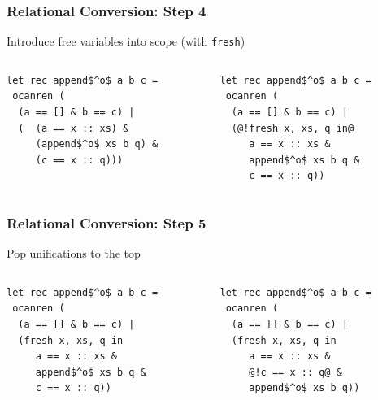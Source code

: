\documentclass[xcolor=table]{beamer}
\begin{document}
\begin{frame}[fragile]
  \transwipe[direction=90]
  \frametitle{Relational Conversion: Step 4}
\begin{center}
Introduce free variables into scope  (with \lstinline{fresh})
\end{center}

\begin{columns}
\begin{column}{0.5\textwidth}
\begin{lstlisting}
let rec append$^o$ a b c =
 ocanren (
  (a == [] & b == c) |
  (  (a == x :: xs) &
     (append$^o$ xs b q) &
     (c == x :: q)))
\end{lstlisting}
\end{column}
\begin{column}{0.5\textwidth}
\begin{lstlisting}
let rec append$^o$ a b c =
 ocanren (
  (a == [] & b == c) |
  (@!fresh x, xs, q in@
     a == x :: xs &
     append$^o$ xs b q &
     c == x :: q))
\end{lstlisting}
\end{column}
\end{columns}
\end{frame}


\begin{frame}[fragile]
  \transwipe[direction=90]
  \frametitle{Relational Conversion: Step 5}
\begin{center}
Pop unifications to the top
\end{center}

\begin{columns}
\begin{column}{0.5\textwidth}
\begin{lstlisting}
let rec append$^o$ a b c =
 ocanren (
  (a == [] & b == c) |
  (fresh x, xs, q in
     a == x :: xs &
     append$^o$ xs b q &
     c == x :: q))
\end{lstlisting}
\end{column}
\begin{column}{0.5\textwidth}
\begin{lstlisting}
let rec append$^o$ a b c =
 ocanren (
  (a == [] & b == c) |
  (fresh x, xs, q in
     a == x :: xs &
     @!c == x :: q@ &
     append$^o$ xs b q))
\end{lstlisting}
\end{column}
\end{columns}
\end{frame}
\end{document}
